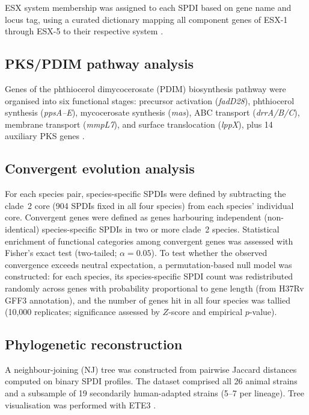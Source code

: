 \documentclass[11pt,a4paper]{article}
\begin{document}
ESX system membership was assigned to each SPDI based on gene name and locus
tag, using a curated dictionary mapping all component genes of ESX-1 through
ESX-5 to their respective system \cite{Houben2012}.

\subsection{PKS/PDIM pathway analysis}
\label{sec:methods:pks}

Genes of the phthiocerol dimycocerosate (PDIM) biosynthesis pathway were
organised into six functional stages: precursor activation (\textit{fadD28}),
phthiocerol synthesis (\textit{ppsA--E}), mycocerosate synthesis (\textit{mas}),
ABC transport (\textit{drrA/B/C}), membrane transport (\textit{mmpL7}),
and surface translocation (\textit{lppX}), plus 14 auxiliary PKS genes
\cite{Trivedi2005, Kolly2017}.

\subsection{Convergent evolution analysis}
\label{sec:methods:convergence}

For each species pair, species-specific SPDIs were defined by subtracting the
clade~2 core (904 SPDIs fixed in all four species) from each
species' individual core.
%
Convergent genes were defined as genes harbouring independent (non-identical)
species-specific SPDIs in two or more clade~2 species.
%
Statistical enrichment of functional categories among convergent genes was
assessed with Fisher's exact test (two-tailed; $\alpha = 0.05$).
%
To test whether the observed convergence exceeds neutral expectation, a
permutation-based null model was constructed: for each species, its
species-specific SPDI count was redistributed randomly across genes
with probability proportional to gene length (from H37Rv GFF3 annotation),
and the number of genes hit in all four species was tallied
(10{,}000 replicates; significance assessed by $Z$-score and empirical
$p$-value).

\subsection{Phylogenetic reconstruction}
\label{sec:methods:phylo}

A neighbour-joining (NJ) tree was constructed from pairwise Jaccard distances
computed on binary SPDI profiles.
%
The dataset comprised all 26 animal strains and a subsample of 19 secondarily human-adapted
strains (5--7 per lineage).
%
Tree visualisation was performed with ETE3 \cite{Huerta-Cepas2016}.
\end{document}
